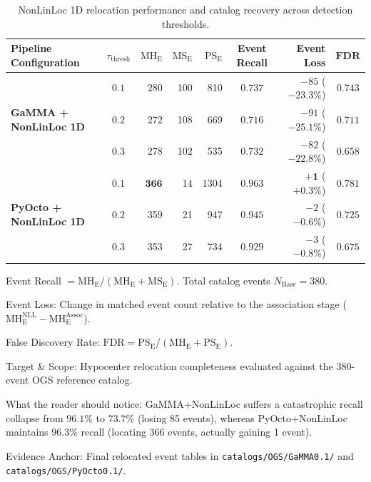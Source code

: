 \begin{table}[htbp]
  \centering
  \small
  \caption{NonLinLoc 1D relocation performance and catalog recovery across detection thresholds.}
  \label{tab:nonlinloc_benchmark}
  \begin{threeparttable}
    \begin{tabularx}{\linewidth}{l c r r r c r c}
      \toprule
      \textbf{Pipeline Configuration} & $\tau_{\mathrm{thresh}}$ & $\mathrm{MH}_{\mathrm{E}}$ & $\mathrm{MS}_{\mathrm{E}}$ & $\mathrm{PS}_{\mathrm{E}}$ & \textbf{Event Recall}\tnote{a} & \textbf{Event Loss}\tnote{b} & $\mathbf{FDR}$\tnote{c} \\
      \midrule
      \multirow{3}{*}{\textbf{GaMMA + NonLinLoc 1D}} & $0.1$ & \num{280} & \num{100} & \num{810} & $\mathbf{0.737}$ & $-85$ ($-23.3\%$) & $0.743$ \\
      & $0.2$ & \num{272} & \num{108} & \num{669} & $0.716$ & $-91$ ($-25.1\%$) & $0.711$ \\
      & $0.3$ & \num{278} & \num{102} & \num{535} & $0.732$ & $-82$ ($-22.8\%$) & $0.658$ \\
      \midrule
      \multirow{3}{*}{\textbf{PyOcto + NonLinLoc 1D}} & $0.1$ & $\mathbf{366}$ & \num{14} & \num{1304} & $\mathbf{0.963}$ & $\mathbf{+1}$ ($+0.3\%$) & $0.781$ \\
      & $0.2$ & \num{359} & \num{21} & \num{947} & $0.945$ & $-2$ ($-0.6\%$) & $0.725$ \\
      & $0.3$ & \num{353} & \num{27} & \num{734} & $0.929$ & $-3$ ($-0.8\%$) & $0.675$ \\
      \bottomrule
    \end{tabularx}
    \begin{tablenotes}[flushleft]
      \footnotesize
      \item[a] Event Recall $= \mathrm{MH}_{\mathrm{E}} / (\mathrm{MH}_{\mathrm{E}} + \mathrm{MS}_{\mathrm{E}})$. Total catalog events $N_{\mathrm{Base}} = 380$.
      \item[b] Event Loss: Change in matched event count relative to the association stage ($\mathrm{MH}_{\mathrm{E}}^{\mathrm{NLL}} - \mathrm{MH}_{\mathrm{E}}^{\mathrm{Assoc}}$).
      \item[c] False Discovery Rate: $\mathrm{FDR} = \mathrm{PS}_{\mathrm{E}} / (\mathrm{MH}_{\mathrm{E}} + \mathrm{PS}_{\mathrm{E}})$.
      \item Target \& Scope: Hypocenter relocation completeness evaluated against the 380-event OGS reference catalog.
      \item What the reader should notice: GaMMA+NonLinLoc suffers a catastrophic recall collapse from $96.1\%$ to $73.7\%$ (losing 85 events), whereas PyOcto+NonLinLoc maintains $96.3\%$ recall (locating 366 events, actually gaining 1 event).
      \item Evidence Anchor: Final relocated event tables in \texttt{catalogs/OGS/GaMMA0.1/} and \texttt{catalogs/OGS/PyOcto0.1/}.
    \end{tablenotes}
  \end{threeparttable}
\end{table}

